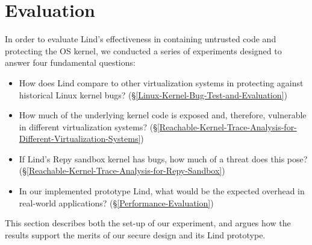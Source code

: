 \section{Evaluation}
\label{sec.evaluation}


In order to evaluate Lind's effectiveness in containing untrusted code and
protecting the OS kernel, we conducted a series of experiments designed to answer
four fundamental questions:

\begin{itemize}
\item How does Lind compare to other virtualization systems
in protecting against historical Linux kernel bugs?
(\S{\ref{Linux-Kernel-Bug-Test-and-Evaluation}})

\item How much of the underlying kernel code is exposed and, therefore,
vulnerable in different virtualization systems?
(\S{\ref{Reachable-Kernel-Trace-Analysis-for-Different-Virtualization-Systems}})
 

\item If Lind's Repy sandbox kernel has bugs, how much of a threat does this pose?
(\S{\ref{Reachable-Kernel-Trace-Analysis-for-Repy-Sandbox}})

\item In our implemented prototype Lind, what would be the expected overhead in
real-world applications?
(\S{\ref{Performance-Evaluation}})
\end{itemize}

This section describes both the set-up of our experiment, and argues
how the results support the merits of our secure design and its Lind prototype.
 

